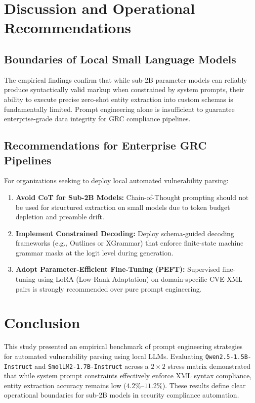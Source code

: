 \documentclass[11pt,a4paper]{article}
\begin{document}
\section{Discussion and Operational Recommendations}

\subsection{Boundaries of Local Small Language Models}
The empirical findings confirm that while sub-2B parameter models can reliably produce syntactically valid markup when constrained by system prompts, their ability to execute precise zero-shot entity extraction into custom schemas is fundamentally limited. Prompt engineering alone is insufficient to guarantee enterprise-grade data integrity for GRC compliance pipelines.

\subsection{Recommendations for Enterprise GRC Pipelines}
For organizations seeking to deploy local automated vulnerability parsing:
\begin{enumerate}
    \item \textbf{Avoid CoT for Sub-2B Models:} Chain-of-Thought prompting should not be used for structured extraction on small models due to token budget depletion and preamble drift.
    \item \textbf{Implement Constrained Decoding:} Deploy schema-guided decoding frameworks (e.g., Outlines or XGrammar) that enforce finite-state machine grammar masks at the logit level during generation.
    \item \textbf{Adopt Parameter-Efficient Fine-Tuning (PEFT):} Supervised fine-tuning using LoRA (Low-Rank Adaptation) on domain-specific CVE-XML pairs is strongly recommended over pure prompt engineering.
\end{enumerate}

\section{Conclusion}
This study presented an empirical benchmark of prompt engineering strategies for automated vulnerability parsing using local LLMs. Evaluating \texttt{Qwen2.5-1.5B-Instruct} and \texttt{SmolLM2-1.7B-Instruct} across a $2 \times 2$ stress matrix demonstrated that while system prompt constraints effectively enforce XML syntax compliance, entity extraction accuracy remains low ($4.2\%$--$11.2\%$). These results define clear operational boundaries for sub-2B models in security compliance automation.



\end{document}
